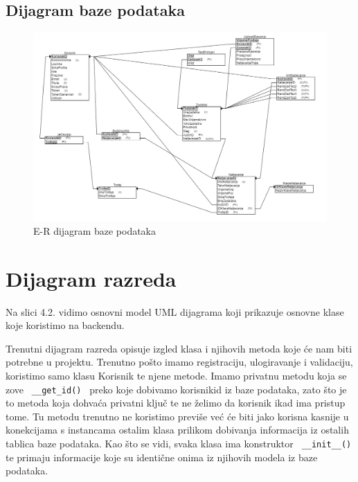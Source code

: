 		
		
		\subsection{Dijagram baze podataka}
		\begin{figure}[H]
			\includegraphics[width=\textwidth]{slike/RelacijskaShema.PNG} %
			\caption{E-R dijagram baze podataka}
			\label{fig:RelacijskaShema} %
		\end{figure}
		
		\eject
			
			
		\section{Dijagram razreda}
			Na slici 4.2. vidimo osnovni model UML dijagrama koji prikazuje osnovne klase koje koristimo na backendu.
				
			Trenutni dijagram razreda opisuje izgled klasa i njihovih metoda koje će nam biti potrebne u projektu. 
			Trenutno pošto imamo registraciju, ulogiravanje i validaciju, koristimo samo klasu Korisnik te njene metode. 
			Imamo privatnu metodu koja se zove \verb*| __get_id() | preko koje dobivamo korisnikid iz baze podataka,
			zato što je to metoda koja dohvaća privatni ključ te ne želimo da korisnik ikad ima pristup tome.
			Tu metodu trenutno ne koristimo previše već će biti jako korisna kasnije u konekcijama s instancama ostalim
			klasa prilikom dobivanja informacija iz ostalih tablica baze podataka. Kao što se vidi, svaka klasa ima 
			konstruktor \verb*| __init__() | te primaju informacije koje su identične onima iz njihovih modela iz baze podataka.


